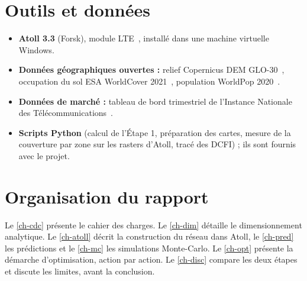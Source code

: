 \section{Outils et données}

\begin{itemize}
  \item \textbf{Atoll 3.3} (Forsk), module LTE~\cite{atoll33}, installé dans une machine virtuelle Windows.
  \item \textbf{Données géographiques ouvertes :} relief Copernicus DEM GLO-30~\cite{copernicusdem}, occupation du sol ESA WorldCover 2021~\cite{worldcover2022}, population WorldPop 2020~\cite{worldpop2018}.
  \item \textbf{Données de marché :} tableau de bord trimestriel de l'Instance Nationale des Télécommunications~\cite{intt2025tr4}.
  \item \textbf{Scripts Python} (calcul de l'Étape 1, préparation des cartes, mesure de la couverture par zone sur les rasters d'Atoll, tracé des DCFI) ; ils sont fournis avec le projet.
\end{itemize}

\section{Organisation du rapport}

Le \cref{ch-cdc} présente le cahier des charges. Le \cref{ch-dim} détaille le dimensionnement analytique. Le \cref{ch-atoll} décrit la construction du réseau dans Atoll, le \cref{ch-pred} les prédictions et le \cref{ch-mc} les simulations Monte-Carlo. Le \cref{ch-opt} présente la démarche d'optimisation, action par action. Le \cref{ch-disc} compare les deux étapes et discute les limites, avant la conclusion.
